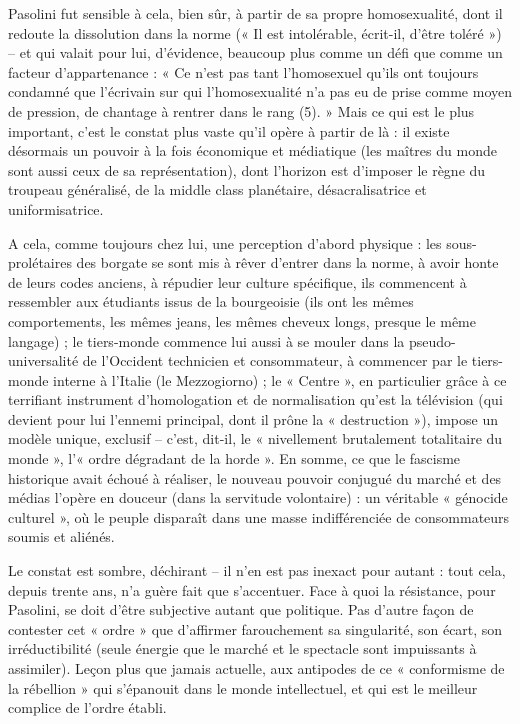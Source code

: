 \documentclass[a4paper,twocolumn]{article}
\begin{document}
Pasolini fut sensible à cela, bien sûr, à partir de sa propre homosexualité, dont il redoute la dissolution dans la norme (« Il est intolérable, écrit-il, d’être toléré ») – et qui valait pour lui, d’évidence, beaucoup plus comme un défi que comme un facteur d’appartenance : « Ce n’est pas tant l’homosexuel qu’ils ont toujours condamné que l’écrivain sur qui l’homosexualité n’a pas eu de prise comme moyen de pression, de chantage à rentrer dans le rang  (5). » Mais ce qui est le plus important, c’est le constat plus vaste qu’il opère à partir de là : il existe désormais un pouvoir à la fois économique et médiatique (les maîtres du monde sont aussi ceux de sa représentation), dont l’horizon est d’imposer le règne du troupeau généralisé, de la middle class planétaire, désacralisatrice et uniformisatrice.

A cela, comme toujours chez lui, une perception d’abord physique : les sous-prolétaires des borgate se sont mis à rêver d’entrer dans la norme, à avoir honte de leurs codes anciens, à répudier leur culture spécifique, ils commencent à ressembler aux étudiants issus de la bourgeoisie (ils ont les mêmes comportements, les mêmes jeans, les mêmes cheveux longs, presque le même langage) ; le tiers-monde commence lui aussi à se mouler dans la pseudo-universalité de l’Occident technicien et consommateur, à commencer par le tiers-monde interne à l’Italie (le Mezzogiorno) ; le « Centre », en particulier grâce à ce terrifiant instrument d’homologation et de normalisation qu’est la télévision (qui devient pour lui l’ennemi principal, dont il prône la « destruction »), impose un modèle unique, exclusif – c’est, dit-il, le « nivellement brutalement totalitaire du monde », l’« ordre dégradant de la horde ». En somme, ce que le fascisme historique avait échoué à réaliser, le nouveau pouvoir conjugué du marché et des médias l’opère en douceur (dans la servitude volontaire) : un véritable « génocide culturel », où le peuple disparaît dans une masse indifférenciée de consommateurs soumis et aliénés.

Le constat est sombre, déchirant – il n’en est pas inexact pour autant : tout cela, depuis trente ans, n’a guère fait que s’accentuer. Face à quoi la résistance, pour Pasolini, se doit d’être subjective autant que politique. Pas d’autre façon de contester cet « ordre » que d’affirmer farouchement sa singularité, son écart, son irréductibilité (seule énergie que le marché et le spectacle sont impuissants à assimiler). Leçon plus que jamais actuelle, aux antipodes de ce « conformisme de la rébellion » qui s’épanouit dans le monde intellectuel, et qui est le meilleur complice de l’ordre établi.
\end{document}
